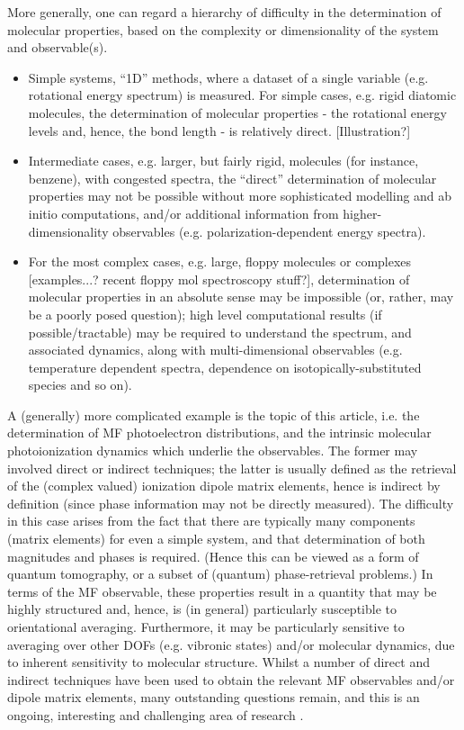 
More generally, one can regard a hierarchy of difficulty in the determination of molecular properties, based on the complexity or dimensionality of the system and observable(s).
\begin{itemize}
\item Simple systems, “1D” methods, where a dataset of a single variable (e.g. rotational energy spectrum) is measured. For simple cases, e.g. rigid diatomic molecules, the determination of molecular properties - the rotational energy levels and, hence, the bond length - is relatively direct. [Illustration?]   
\item Intermediate cases, e.g. larger, but fairly rigid, molecules (for instance, benzene), with congested spectra, the “direct” determination of molecular properties may not be possible without more sophisticated modelling and ab initio computations, and/or additional information from higher-dimensionality observables (e.g. polarization-dependent energy spectra).
\item For the most complex cases, e.g. large, floppy molecules or complexes [examples...? recent floppy mol spectroscopy stuff?], determination of molecular properties in an absolute sense may be impossible (or, rather, may be a poorly posed question); high level computational results (if possible/tractable) may be required to understand the spectrum, and associated dynamics, along with multi-dimensional observables (e.g. temperature dependent spectra, dependence on isotopically-substituted species and so on).
\end{itemize}    

A (generally) more complicated example is the topic of this article, i.e. the determination of MF photoelectron distributions, and the intrinsic molecular photoionization dynamics which underlie the observables.  The former may involved direct or indirect techniques; the latter is usually defined as the retrieval of the (complex valued) ionization dipole matrix elements, hence is indirect by definition (since phase information may not be directly measured). The difficulty in this case arises from the fact that there are typically many components (matrix elements) for even a simple system, and that determination of both magnitudes and phases is required. (Hence this can be viewed as a form of quantum tomography, or a subset of (quantum) phase-retrieval problems.) In terms of the MF observable, these properties result in a quantity that may be highly structured and, hence, is (in general) particularly susceptible to orientational averaging. Furthermore, it may be particularly sensitive to averaging over other DOFs (e.g. vibronic states) and/or molecular dynamics, due to inherent sensitivity to molecular structure. Whilst a number of direct and indirect techniques have been used to obtain the relevant MF observables and/or dipole matrix elements, many outstanding questions remain, and this is an ongoing, interesting and challenging area of research \cite{hockett2018QuantumMetrologyPhotoelectrons,hockett2018QuantumMetrologyPhotoelectronsa}.
